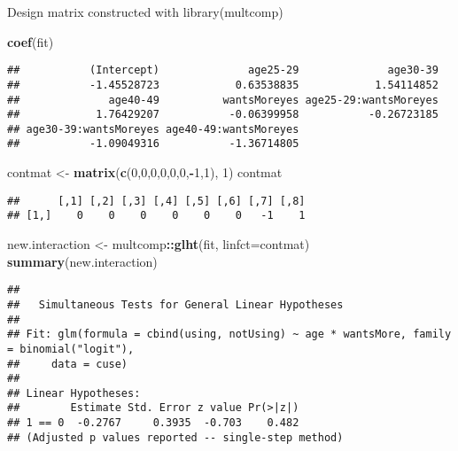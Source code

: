 \documentclass[
  ignorenonframetext,
]{beamer}
\newenvironment{Shaded}{\begin{snugshade}}{\end{snugshade}}
\newcommand{\DataTypeTok}[1]{\textcolor[rgb]{0.13,0.29,0.53}{#1}}
\newcommand{\DecValTok}[1]{\textcolor[rgb]{0.00,0.00,0.81}{#1}}
\newcommand{\KeywordTok}[1]{\textcolor[rgb]{0.13,0.29,0.53}{\textbf{#1}}}
\newcommand{\NormalTok}[1]{#1}
\newcommand{\OperatorTok}[1]{\textcolor[rgb]{0.81,0.36,0.00}{\textbf{#1}}}
\newcommand{\StringTok}[1]{\textcolor[rgb]{0.31,0.60,0.02}{#1}}
\begin{document}
\begin{frame}[fragile]{Design matrix constructed with library(multcomp)}
\protect\hypertarget{design-matrix-constructed-with-librarymultcomp}{}

\tiny

\begin{Shaded}
\begin{Highlighting}[]
\KeywordTok{coef}\NormalTok{(fit)}
\end{Highlighting}
\end{Shaded}

\begin{verbatim}
##           (Intercept)              age25-29              age30-39 
##           -1.45528723            0.63538835            1.54114852 
##              age40-49          wantsMoreyes age25-29:wantsMoreyes 
##            1.76429207           -0.06399958           -0.26723185 
## age30-39:wantsMoreyes age40-49:wantsMoreyes 
##           -1.09049316           -1.36714805
\end{verbatim}

\begin{Shaded}
\begin{Highlighting}[]
\NormalTok{contmat <-}\StringTok{ }\KeywordTok{matrix}\NormalTok{(}\KeywordTok{c}\NormalTok{(}\DecValTok{0}\NormalTok{,}\DecValTok{0}\NormalTok{,}\DecValTok{0}\NormalTok{,}\DecValTok{0}\NormalTok{,}\DecValTok{0}\NormalTok{,}\DecValTok{0}\NormalTok{,}\OperatorTok{-}\DecValTok{1}\NormalTok{,}\DecValTok{1}\NormalTok{), }\DecValTok{1}\NormalTok{) }
\NormalTok{contmat}
\end{Highlighting}
\end{Shaded}

\begin{verbatim}
##      [,1] [,2] [,3] [,4] [,5] [,6] [,7] [,8]
## [1,]    0    0    0    0    0    0   -1    1
\end{verbatim}

\begin{Shaded}
\begin{Highlighting}[]
\NormalTok{new.interaction <-}\StringTok{ }\NormalTok{multcomp}\OperatorTok{::}\KeywordTok{glht}\NormalTok{(fit, }\DataTypeTok{linfct=}\NormalTok{contmat) }
\KeywordTok{summary}\NormalTok{(new.interaction)}
\end{Highlighting}
\end{Shaded}

\begin{verbatim}
## 
##   Simultaneous Tests for General Linear Hypotheses
## 
## Fit: glm(formula = cbind(using, notUsing) ~ age * wantsMore, family = binomial("logit"), 
##     data = cuse)
## 
## Linear Hypotheses:
##        Estimate Std. Error z value Pr(>|z|)
## 1 == 0  -0.2767     0.3935  -0.703    0.482
## (Adjusted p values reported -- single-step method)
\end{verbatim}

\end{frame}
\end{document}
